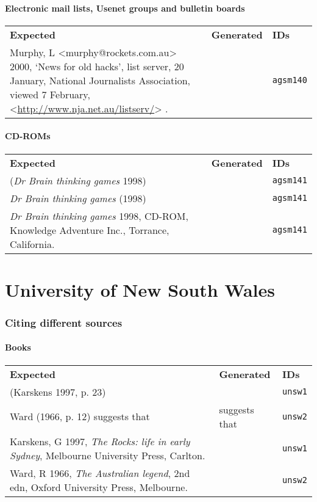 \documentclass[a4paper,landscape,12pt]{article}
\newlength\q
\newlength\qr
\newenvironment{citetable}
  {\noindent\begin{longtable}{p{\q} p{\q} p{\qr}}\textbf{Expected} & \textbf{Generated} & \textbf{IDs}\\}
  {\end{longtable}}
\newcommand{\minorissue}[1]{\textcolor{blue}{#1}}
\newcommand{\citeurlex}[1]{%
  \let\oldurlfont\UrlFont%
  \def\UrlFont{}%
  \textless\url{#1}\textgreater%
  \let\UrlFont\oldurlfont}
\begin{document}
\subsection{Electronic mail lists, Usenet groups and bulletin boards}

\begin{citetable}
	Murphy, L \textless{}murphy@rockets.com.au\textgreater{} 2000, `News for old hacks', list server, 20 January, National Journalists Association, viewed 7 February, \citeurlex{http://www.nja.net.au/listserv/}. & \minorissue{\fullcite{agsm140}} & \texttt{agsm140} \\
\end{citetable}

\subsection{CD-ROMs}

\begin{citetable}
	(\textit{Dr Brain thinking games} 1998) & \parencite{agsm141} & \texttt{agsm141} \\
	\textit{Dr Brain thinking games} (1998) & \textcite{agsm141} & \texttt{agsm141} \\
	\textit{Dr Brain thinking games} 1998, CD-ROM, Knowledge Adventure Inc., Torrance, California. & \fullcite{agsm141} & \texttt{agsm141} \\
\end{citetable}

\printbibliography

\clearpage
\part{University of New South Wales}
\newrefsection

\section{Citing different sources}

\subsection{Books}

\begin{citetable}
	(Karskens 1997, p. 23) & \parencite[p.~23]{unsw1} & \texttt{unsw1} \\
	Ward (1966, p. 12) suggests that & \textcite[p.~12]{unsw2} suggests that & \texttt{unsw2} \\
	Karskens, G 1997, \textit{The Rocks: life in early Sydney}, Melbourne University Press, Carlton. & \fullcite{unsw1} & \texttt{unsw1} \\
	Ward, R 1966, \textit{The Australian legend}, 2nd edn, Oxford University Press, Melbourne. & \fullcite{unsw2} & \texttt{unsw2} \\
\end{citetable}
\end{document}
